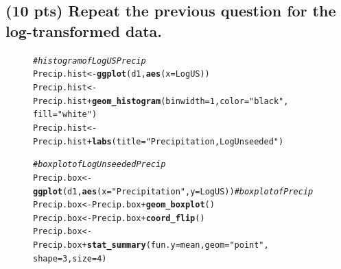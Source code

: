 \documentclass{article}\usepackage[]{graphicx}\usepackage[]{color}
\makeatletter
\newcommand{\hlnum}[1]{\textcolor[rgb]{0.686,0.059,0.569}{#1}}%
\newcommand{\hlstr}[1]{\textcolor[rgb]{0.192,0.494,0.8}{#1}}%
\newcommand{\hlcom}[1]{\textcolor[rgb]{0.678,0.584,0.686}{\textit{#1}}}%
\newcommand{\hlopt}[1]{\textcolor[rgb]{0,0,0}{#1}}%
\newcommand{\hlstd}[1]{\textcolor[rgb]{0.345,0.345,0.345}{#1}}%
\newcommand{\hlkwb}[1]{\textcolor[rgb]{0.69,0.353,0.396}{#1}}%
\newcommand{\hlkwc}[1]{\textcolor[rgb]{0.333,0.667,0.333}{#1}}%
\newcommand{\hlkwd}[1]{\textcolor[rgb]{0.737,0.353,0.396}{\textbf{#1}}}%
\newenvironment{kframe}{%
 \def\at@end@of@kframe{}%
 \ifinner\ifhmode%
  \def\at@end@of@kframe{\end{minipage}}%
  \begin{minipage}{\columnwidth}%
 \fi\fi%
 \def\FrameCommand##1{\hskip\@totalleftmargin \hskip-\fboxsep
 \colorbox{shadecolor}{##1}\hskip-\fboxsep
     \hskip-\linewidth \hskip-\@totalleftmargin \hskip\columnwidth}%
 \MakeFramed {\advance\hsize-\width
   \@totalleftmargin\z@ \linewidth\hsize
   \@setminipage}}%
 {\par\unskip\endMakeFramed%
 \at@end@of@kframe}
\newenvironment{knitrout}{}{} %
\makeatother
\begin{document}
\subsection{(10 pts) Repeat the previous question for the log-transformed data.}

\begin{figure}[H]  \begin{center}
\begin{knitrout}
\color{fgcolor}\begin{kframe}
\begin{alltt}
\hlcom{# histogram of LogUS Precip}
\hlstd{Precip.hist} \hlkwb{<-} \hlkwd{ggplot}\hlstd{(d1,} \hlkwd{aes}\hlstd{(}\hlkwc{x} \hlstd{= LogUS))}
\hlstd{Precip.hist} \hlkwb{<-} \hlstd{Precip.hist} \hlopt{+} \hlkwd{geom_histogram}\hlstd{(}\hlkwc{binwidth} \hlstd{=} \hlnum{1}\hlstd{,}\hlkwc{color} \hlstd{=} \hlstr{"black"}\hlstd{,}
                                            \hlkwc{fill} \hlstd{=} \hlstr{"white"}\hlstd{)}
\hlstd{Precip.hist} \hlkwb{<-} \hlstd{Precip.hist} \hlopt{+} \hlkwd{labs}\hlstd{(}\hlkwc{title} \hlstd{=} \hlstr{"Precipitation, Log Unseeded"}\hlstd{)}

\hlcom{# boxplot of Log Unseeded Precip}
\hlstd{Precip.box} \hlkwb{<-} \hlkwd{ggplot}\hlstd{(d1,} \hlkwd{aes}\hlstd{(}\hlkwc{x} \hlstd{=} \hlstr{"Precipitation"}\hlstd{,}\hlkwc{y} \hlstd{= LogUS))} \hlcom{# boxplot of Precip}
\hlstd{Precip.box} \hlkwb{<-} \hlstd{Precip.box} \hlopt{+} \hlkwd{geom_boxplot}\hlstd{()}
\hlstd{Precip.box} \hlkwb{<-} \hlstd{Precip.box} \hlopt{+} \hlkwd{coord_flip}\hlstd{()}
\hlstd{Precip.box} \hlkwb{<-} \hlstd{Precip.box} \hlopt{+} \hlkwd{stat_summary}\hlstd{(}\hlkwc{fun.y} \hlstd{= mean,} \hlkwc{geom} \hlstd{=} \hlstr{"point"}\hlstd{,}
                                        \hlkwc{shape} \hlstd{=} \hlnum{3}\hlstd{,} \hlkwc{size} \hlstd{=} \hlnum{4}\hlstd{)}


\end{alltt}
\end{kframe}
\end{knitrout}
\end{center}
\end{figure}
\end{document}
